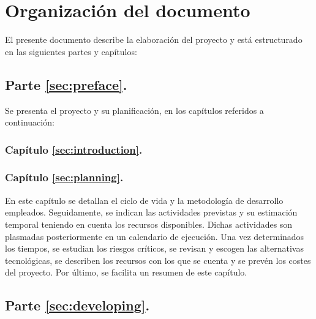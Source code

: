 \section{Organización del documento}
\label{sec:organization}

El presente documento describe la elaboración del proyecto y está estructurado en las siguientes partes y capítulos:

\subsection*{Parte \ref{sec:preface}. }

Se presenta el proyecto y su planificación, en los capítulos referidos a continuación:

\subsubsection*{Capítulo \ref{sec:introduction}. }

\introIntroduction %

\subsubsection*{Capítulo \ref{sec:planning}. }

\def \introPlanning {En este capítulo se detallan el ciclo de vida y la metodología de desarrollo empleados. Seguidamente, se indican las actividades previstas y su estimación temporal teniendo en cuenta los recursos disponibles. Dichas actividades son plasmadas posteriormente en un calendario de ejecución. Una vez determinados los tiempos, se estudian los riesgos críticos, se revisan y escogen las alternativas tecnológicas, se describen los recursos con los que se cuenta y se prevén los costes del proyecto. Por último, se facilita un resumen de este capítulo.}

\introPlanning

\subsection*{Parte \ref{sec:developing}. }


